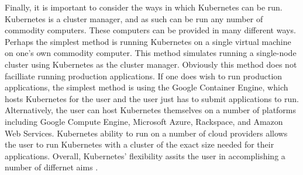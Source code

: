 Finally, it is important to consider the ways in which Kubernetes can be run.
Kubernetes is a cluster manager, and as such can be run any number of commodity
computers. These computers can be provided in many different ways. Perhaps the
simplest method is running Kubernetes on a single virtual machine on one's own
commodity computer. This method simulates running a single-node cluster using
Kubernetes as the cluster manager. Obviously this method does not facilliate
running production applications. If one does wish to run production
applications, the simplest method is using the Google Container Engine, which
hosts Kubernetes for the user and the user just has to submit applications to
run. Alternatively, the user can host Kubernetes themselves on a number of
platforms including Google Compute Engine, Microsoft Azure, Rackspace, and
Amazon Web Services. Kubernetes ability to run on a number of cloud providers
allows the user to run Kubernetes with a cluster of the exact size needed for
their applications. Overall, Kubernetes' flexibility assits the user in
accomplishing a number of differnet aims \cite{getting-started-k8s}.
